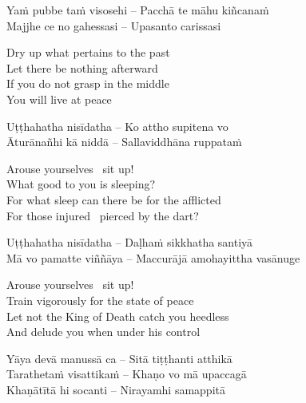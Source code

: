 \suttaRef{[Dhp 91]}

\begin{verses}
  Yaṁ pubbe taṁ visosehi – Pacchā te māhu kiñcanaṁ\\
  Majjhe ce no gahessasi – Upasanto carissasi
\end{verses}

\begin{english-verses}
  Dry up what pertains to the past\\
  Let there be nothing afterward\\
  If you do not grasp in the middle\\
  You will live at peace
\end{english-verses}

\suttaRef{[Snp 949]}

\begin{verses}
  Uṭṭhahatha nisīdatha – Ko attho supitena vo\\
  Āturānañhi kā niddā – Sallaviddhāna ruppataṁ
\end{verses}

\begin{english-verses}
  Arouse yourselves \breathmark\ sit up!\\
  What good to you is sleeping?\\
  For what sleep can there be for the afflicted\\
  For those injured \breathmark\ pierced by the dart?
\end{english-verses}

\begin{verses}
  Uṭṭhahatha nisīdatha – Daḷhaṁ sikkhatha santiyā\\
  Mā vo pamatte viññāya – Maccurājā amohayittha vasānuge
\end{verses}

\begin{english-verses}
  Arouse yourselves \breathmark\ sit up!\\
  Train vigorously for the state of peace\\
  Let not the King of Death catch you heedless\\
  And delude you when under his control
\end{english-verses}

\begin{verses}
  Yāya devā manussā ca – Sitā tiṭṭhanti atthikā\\
  Tarathetaṁ visattikaṁ – Khaṇo vo mā upaccagā\\
  Khaṇātītā hi socanti – Nirayamhi samappitā
\end{verses}

